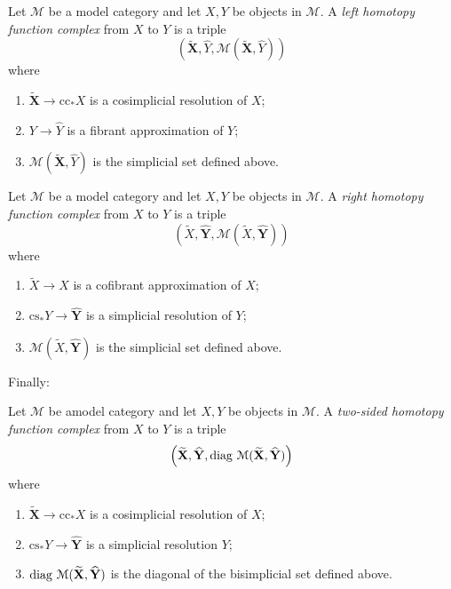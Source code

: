 \begin{refsection}
\begin{defin}
Let $\mathcal M$ be a model category and let $X,Y$ be objects in $\mathcal M$. A \emph{left homotopy function complex} from $X$ to $Y$ is a triple
\[
\left( \widetilde{\mathbf X}, \widehat{Y}, \mathcal M( \widetilde{\mathbf X}, \widehat{Y}) \right)
\]
where
\begin{enumerate}
\item $\widetilde{\mathbf X} \to \mathrm{cc}_* X$ is a cosimplicial resolution of $X$;
\item $Y \to \widehat{Y}$ is a fibrant approximation of $Y$;
\item $\mathcal M(\widetilde{\mathbf X}, \widehat{Y})$ is the simplicial set defined above.
\end{enumerate}
\end{defin}

\begin{defin}
Let $\mathcal M$ be a model category and let $X,Y$ be objects in $\mathcal M$. A \emph{right homotopy function complex} from $X$ to $Y$ is a triple
\[
\left( \widetilde{X}, \widehat{\mathbf Y}, \mathcal M(\widetilde{X}, \widehat{\mathbf Y}) \right)
\]
where
\begin{enumerate}
\item $\widetilde{X} \to X$ is a cofibrant approximation of $X$;
\item $\mathrm{cs}_* Y \to \widehat{\mathbf Y}$ is a simplicial resolution of $Y$;
\item $\mathcal M(\widetilde{X}, \widehat{\mathbf Y})$ is the simplicial set defined above.
\end{enumerate}
\end{defin}

Finally:

\begin{defin}
Let $\mathcal M$ be amodel category and let $X,Y$ be objects in $\mathcal M$. A \emph{two-sided homotopy function complex} from $X$ to $Y$ is a triple
\[
\left( \widetilde{\mathbf X}, \widehat{\mathbf Y}, \operatorname{\mathrm{diag} \,} \mathcal M(\widetilde{\mathbf X}, \widehat{\mathbf Y}) \right)
\]
where
\begin{enumerate}
\item $\widetilde{\mathbf X} \to \mathrm{cc}_* X$ is a cosimplicial resolution of $X$;
\item $\mathrm{cs}_* Y \to \widehat{\mathbf Y}$ is a simplicial resolution $Y$;
\item $\operatorname{\mathrm{diag} \,} \mathcal M(\widetilde{\mathbf X}, \widehat{\mathbf Y})$ is the diagonal of the bisimplicial set defined above.
\end{enumerate}
\end{defin}


\end{refsection}
